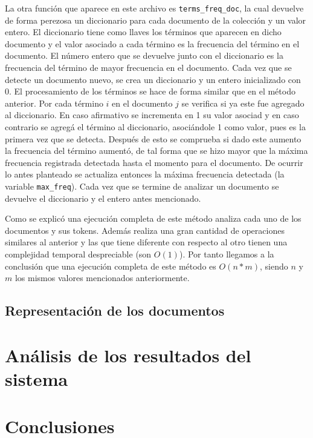 \documentclass[runningheads]{llncs}
\begin{document}
	La otra funci\'on que aparece en este archivo es \verb|terms_freq_doc|, la cual devuelve de forma perezosa un diccionario para cada documento de la colecci\'on y un valor entero. El diccionario tiene como llaves los t\'erminos que aparecen en dicho documento y el valor asociado a cada t\'ermino es la frecuencia del t\'ermino en el documento. El n\'umero entero que se devuelve junto con el diccionario es la frecuencia del t\'ermino de mayor frecuencia en el documento. Cada vez que se detecte un documento nuevo, se crea un diccionario y un entero inicializado con 0. El procesamiento de los t\'erminos se hace de forma similar que en el m\'etodo anterior. Por cada t\'ermino $i$ en el documento $j$ se verifica si ya este fue agregado al diccionario. En caso afirmativo se incrementa en 1 su valor asociad y en caso contrario se agreg\'a el t\'ermino al diccionario, asoci\'andole 1 como valor, pues es la primera vez que se detecta. Despu\'es de esto se comprueba si dado este aumento la frecuencia del t\'ermino aument\'o, de tal forma que se hizo mayor que la m\'axima frecuencia registrada detectada hasta el momento para el documento. De ocurrir lo antes planteado se actualiza entonces la m\'axima frecuencia detectada (la variable \verb|max_freq|). Cada vez que se termine de analizar un documento se devuelve el diccionario y el entero antes mencionado.
	
	Como se explic\'o una ejecuci\'on completa de este m\'etodo analiza cada uno de los documentos y sus tokens. Adem\'as realiza una gran cantidad de operaciones similares al anterior y las que tiene diferente con respecto al otro tienen una complejidad temporal despreciable (son $O(1)$). Por tanto llegamos a la conclusi\'on que una ejecuci\'on completa de este m\'etodo es $O(n*m)$, siendo $n$ y $m$ los mismos valores mencionados anteriormente.
	
	\subsection{Representaci\'on de los documentos}
	
	 
	
	\section{An\'alisis de los resultados del sistema}
	
	
	\section{Conclusiones}
	
	
	
	\begin{thebibliography}{1}
		
	\end{thebibliography}
\end{document}
